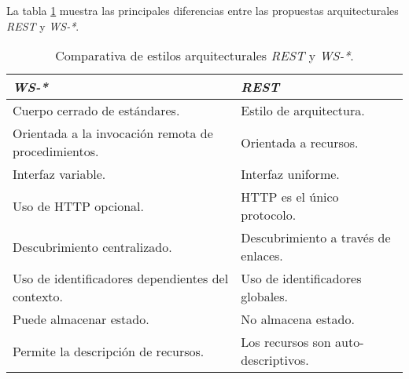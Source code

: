 La tabla \ref{restvsws} muestra las principales diferencias entre las propuestas arquitecturales \textit{REST} y \textit{WS-*}.\\

\begin{table}
\centering
\caption{Comparativa de estilos arquitecturales \textit{REST} y \textit{WS-*}.}
\label{restvsws}
\begin{center}
\begin{tabular}{|l|l|}\hline
\textbf{\textit{WS-*}} & \textbf{\textit{REST}} \\\hline
Cuerpo cerrado de est\'andares. & Estilo de arquitectura. \\
Orientada a la invocaci\'on remota de procedimientos. & Orientada a recursos. \\
Interfaz variable. & Interfaz uniforme.\\
Uso de HTTP opcional. & HTTP es el \'unico protocolo. \\
Descubrimiento centralizado. & Descubrimiento a trav\'es de enlaces.\\
Uso de identificadores dependientes del contexto. & Uso de identificadores globales.\\
Puede almacenar estado. & No almacena estado. \\
Permite la descripci\'on de recursos. & Los recursos son auto-descriptivos.\\\hline
\end{tabular}
\end{center}
\end{table}


